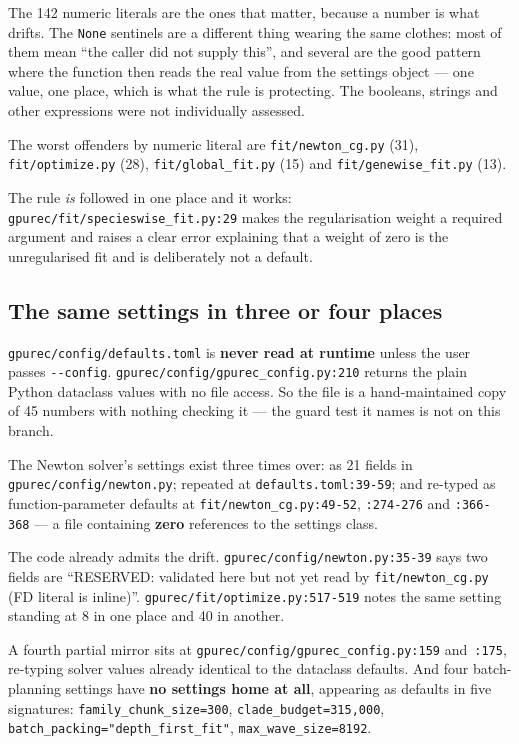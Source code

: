\documentclass[11pt]{article}
\newcommand{\loc}[1]{\nolinkurl{#1}}
\newcommand{\dir}[1]{\nolinkurl{#1}}
\begin{document}
The 142 numeric literals are the ones that matter, because a number is what
drifts.  The \texttt{None} sentinels are a different thing wearing the same
clothes: most of them mean ``the caller did not supply this'', and several are
the good pattern where the function then reads the real value from the settings
object --- one value, one place, which is what the rule is protecting.  The
booleans, strings and other expressions were not individually assessed.

The worst offenders by numeric literal are \dir{fit/newton\_cg.py} (31),
\dir{fit/optimize.py} (28), \dir{fit/global\_fit.py} (15) and
\dir{fit/genewise\_fit.py} (13).

The rule \emph{is} followed in one place and it works:
\loc{gpurec/fit/specieswise\_fit.py:29} makes the regularisation weight a
required argument and raises a clear error explaining that a weight of zero is
the unregularised fit and is deliberately not a default.

\subsection{The same settings in three or four places}
\label{sec:config-mirrors}

\dir{gpurec/config/defaults.toml} is \textbf{never read at runtime} unless the
user passes \texttt{-{}-config}.  \loc{gpurec/config/gpurec\_config.py:210}
returns the plain Python dataclass values with no file access.  So the file is a
hand-maintained copy of 45 numbers with nothing checking it --- the guard test
it names is not on this branch.

The Newton solver's settings exist three times over: as 21 fields in
\dir{gpurec/config/newton.py}; repeated at \loc{defaults.toml:39-59}; and
re-typed as function-parameter defaults at \loc{fit/newton\_cg.py:49-52},
\loc{:274-276} and \loc{:366-368} --- a file containing \textbf{zero} references
to the settings class.

The code already admits the drift.  \loc{gpurec/config/newton.py:35-39} says two
fields are ``RESERVED: validated here but not yet read by
\dir{fit/newton\_cg.py} (FD literal is inline)''.
\loc{gpurec/fit/optimize.py:517-519} notes the same setting standing at 8 in one
place and 40 in another.

A fourth partial mirror sits at \loc{gpurec/config/gpurec\_config.py:159}
and~\loc{:175}, re-typing solver values already identical to the dataclass
defaults.  And four batch-planning settings have \textbf{no settings home at
all}, appearing as defaults in five signatures:
\texttt{family\_chunk\_size=300}, \texttt{clade\_budget=315{,}000},
\texttt{batch\_packing="depth\_first\_fit"}, \texttt{max\_wave\_size=8192}.
\end{document}
